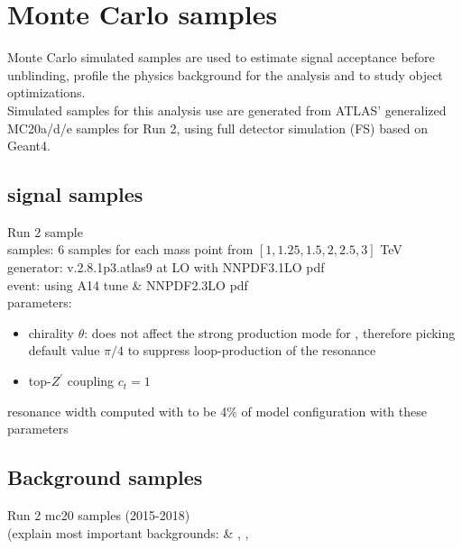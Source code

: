 \documentclass[../thesis.tex]{subfiles}
\begin{document}
\section{Monte Carlo samples}
\label{sec:montecarlo}
Monte Carlo simulated samples are used to estimate signal acceptance before unblinding, profile the physics background for the analysis and to study object optimizations.\\
Simulated samples for this analysis use are generated from ATLAS' generalized MC20a/d/e samples for Run 2, using full detector simulation (FS) based on Geant4.

\subsection{\ttZp signal samples}
Run 2 \ttZp sample\\
samples: 6 samples for each mass point from $[1, 1.25, 1.5, 2, 2.5, 3]$ TeV\\
generator: \mgamc v.2.8.1p3.atlas9 at LO with \textsc{NNPDF3.1LO} pdf\\
event: \pythia[v.244p3.rangefix] using \textsc{A14} tune \& \textsc{NNPDF2.3LO} pdf\\
parameters:
\begin{itemize}
\item chirality $\theta$: does not affect the strong production mode for \ttZp, therefore picking default value $\pi/4$ to suppress loop-production of the \Zp resonance
\item top-$Z^{'}$ coupling $c_t=1$
\end{itemize}
resonance width computed with \mgamc to be 4\% of model configuration with these parameters

\subsection{Background samples}
Run 2 mc20 samples (2015-2018)\\
(explain most important backgrounds: \tttt \& \ttt, \ttV, \tt
\end{document}
